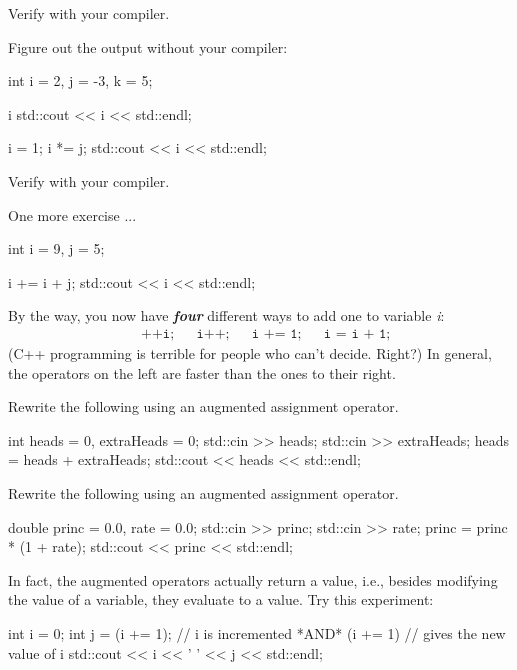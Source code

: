 Verify with your compiler.


\begin{ex}
Figure out the output without your compiler:
\begin{console}
int i = 2, j = -3, k = 5;

i %
std::cout << i << std::endl;

i = 1;
i *= j;
std::cout << i << std::endl;
\end{console}
\end{ex}

Verify with your compiler.


\begin{ex}
One more exercise ...
\begin{console}
int i = 9, j = 5;

i += i + j;
std::cout << i << std::endl;
\end{console}
\end{ex}

By the way, you now have \emph{\textbf{four}} different ways to add one
to variable \emph{i}:
\begin{align*}
&\texttt{++i;} &&\texttt{i++;} &&\texttt{i += 1;} &&\texttt{i = i + 1;}
\end{align*}
(C++ programming is terrible for people who can't decide. Right?) In general, the operators on the left are faster than the ones to their right.

\begin{ex}
Rewrite the following using an augmented assignment
operator.
\begin{console}
int heads = 0, extraHeads = 0;
std::cin >> heads;
std::cin >> extraHeads;
heads = heads + extraHeads;
std::cout << heads << std::endl;
\end{console}
\end{ex}


\begin{ex}

Rewrite the following using an augmented assignment
operator.
\begin{console}
double princ = 0.0, rate = 0.0;
std::cin >> princ;
std::cin >> rate;
princ = princ * (1 + rate);
std::cout << princ << std::endl;
\end{console}
\end{ex}


\begin{ex}
 In fact, the augmented operators actually return a
value, i.e., besides modifying the value of a variable, they evaluate to
a value. Try this experiment:
\begin{console}
int i = 0;
int j = (i += 1); // i is incremented *AND* (i += 1)
// gives the new value of i
std::cout << i << ' ' << j << std::endl;
\end{console}
\end{ex}

